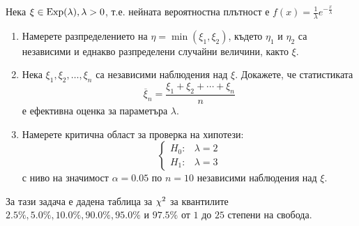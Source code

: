\documentclass[numbers=endperiod, DIV=15, bibliography=totocnumbered]{scrartcl}
\begin{document}
\begin{exercise}\label{ex:se-summer2011}
  Нека $\xi \in \operatorname{Exp}(\lambda), \lambda > 0$, т.е. нейната вероятностна плътност е $f(x) = \frac 1 \lambda e^{-\frac x \lambda}$
  \begin{enumerate}[label=\alph*)]
    \item Намерете разпределението на $\eta = \min(\xi_1, \xi_2)$, където $\eta_1$ и $\eta_2$ са независими и еднакво разпределени случайни величини, както $\xi$.

    \item Нека $\xi_1, \xi_2, \ldots, \xi_n$ са независими наблюдения над $\xi$. Докажете, че статистиката
    \begin{displaymath}
      \overline \xi_n = \frac {\xi_1 + \xi_2 + \cdots + \xi_n} n
    \end{displaymath}
    е ефективна оценка за параметъра $\lambda$.

    \item Намерете критична област за проверка на хипотези:
    \begin{displaymath}
      \begin{cases}
        H_0: &\lambda = 2 \\
        H_1: &\lambda = 3
      \end{cases}
    \end{displaymath}
    с ниво на значимост $\alpha = 0.05$ по $n = 10$ независими наблюдения над $\xi$.
  \end{enumerate}
\end{exercise}

\begin{note}
  За тази задача е дадена таблица за $\operatorname{\chi^2}$ за квантилите $2.5\%, 5.0\%, 10.0\%, 90.0\%, 95.0\%$ и $97.5\%$ от $1$ до $25$ степени на свобода.
\end{note}
\end{document}
